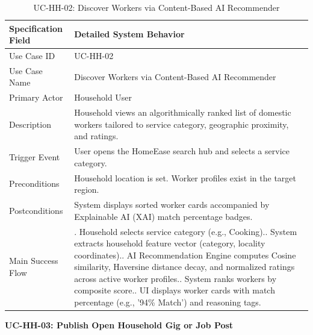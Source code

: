 \documentclass[12pt,a4paper]{article}
\begin{document}
\begin{longtable}{|>{\raggedright\arraybackslash}p{\dimexpr(\linewidth-4\tabcolsep-3\arrayrulewidth)/2\relax}|>{\raggedright\arraybackslash}p{\dimexpr(\linewidth-4\tabcolsep-3\arrayrulewidth)/2\relax}|}
\caption{UC-HH-02: Discover Workers via Content-Based AI Recommender}\label{tab:uc-hh-02}\\
\hline
Specification Field & Detailed System Behavior \\ \hline
Use Case ID & UC-HH-02 \\ \hline
Use Case Name & Discover Workers via Content-Based AI Recommender \\ \hline
Primary Actor & Household User \\ \hline
Description & Household views an algorithmically ranked list of domestic workers tailored to service category, geographic proximity, and ratings. \\ \hline
Trigger Event & User opens the HomeEase search hub and selects a service category. \\ \hline
Preconditions & Household location is set. Worker profiles exist in the target region. \\ \hline
Postconditions & System displays sorted worker cards accompanied by Explainable AI (XAI) match percentage badges. \\ \hline
Main Success Flow & 1. Household selects service category (e.g., Cooking).\newline 2. System extracts household feature vector (category, locality coordinates).\newline 3. AI Recommendation Engine computes Cosine similarity, Haversine distance decay, and normalized ratings across active worker profiles.\newline 4. System ranks workers by composite score.\newline 5. UI displays worker cards with match percentage (e.g., '94\% Match') and reasoning tags. \\ \hline
\end{longtable}
\endgroup
\clearpage
\noindent\textbf{UC-HH-03: Publish Open Household Gig or Job Post}\par
\vspace{4pt}
\begingroup\small\setlength{\tabcolsep}{3pt}\renewcommand{\arraystretch}{1.15}
\end{document}
